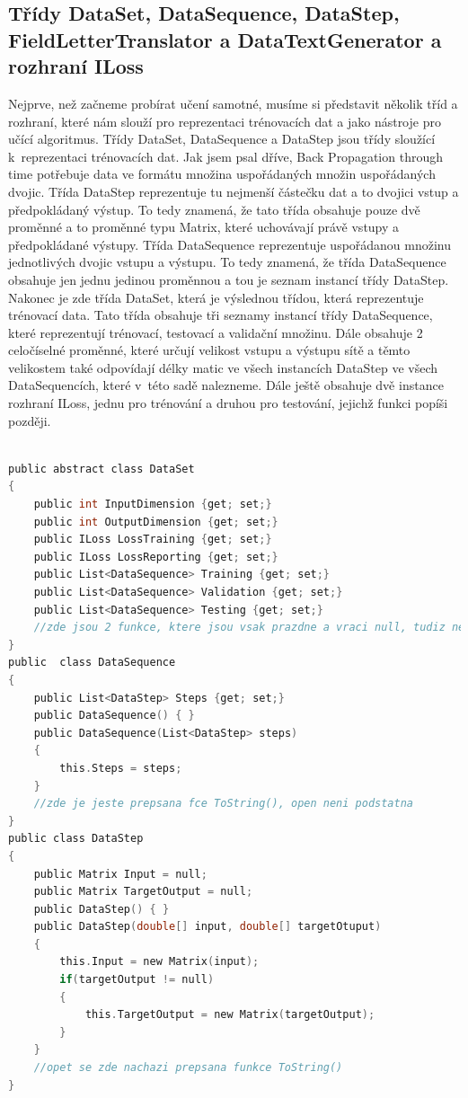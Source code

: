\documentclass[a4paper]{article}
\begin{document}
\subsection{Třídy DataSet, DataSequence, DataStep, FieldLetterTranslator a DataTextGenerator a rozhraní ILoss}
Nejprve, než začneme probírat učení samotné, musíme si představit několik tříd a rozhraní, které nám slouží pro reprezentaci trénovacích dat a jako nástroje pro učící algoritmus. Třídy DataSet, DataSequence a DataStep jsou třídy sloužící k~reprezentaci trénovacích dat. Jak jsem psal dříve, Back Propagation through time potřebuje data ve formátu množina uspořádaných množin uspořádaných dvojic. Třída DataStep reprezentuje tu nejmenší částečku dat a to dvojici vstup a předpokládaný výstup. To tedy znamená, že tato třída obsahuje pouze dvě proměnné a to proměnné typu Matrix, které uchovávají právě vstupy a předpokládané výstupy. Třída DataSequence reprezentuje uspořádanou množinu jednotlivých dvojic vstupu a výstupu. To tedy znamená, že třída DataSequence obsahuje jen jednu jedinou proměnnou a tou je seznam instancí třídy DataStep. Nakonec je zde třída DataSet, která je výslednou třídou, která reprezentuje trénovací data. Tato třída obsahuje tři seznamy instancí třídy DataSequence, které reprezentují trénovací, testovací a validační množinu. Dále obsahuje 2 celočíselné proměnné, které určují velikost vstupu a výstupu sítě a těmto velikostem také odpovídají délky matic ve všech instancích DataStep ve všech DataSequencích, které v~této sadě nalezneme. Dále ještě obsahuje dvě instance rozhraní ILoss, jednu pro trénování a druhou pro testování, jejichž funkci popíši později.
\begin{lstlisting}[language=c, title={Ukázka tříd DataStep, DataSequence a DataSet}]

public abstract class DataSet
{
	public int InputDimension {get; set;}
	public int OutputDimension {get; set;}
	public ILoss LossTraining {get; set;}
	public ILoss LossReporting {get; set;}
	public List<DataSequence> Training {get; set;}
	public List<DataSequence> Validation {get; set;}
	public List<DataSequence> Testing {get; set;}
	//zde jsou 2 funkce, ktere jsou vsak prazdne a vraci null, tudiz nejsou potreba uvadet
}
public  class DataSequence
{
	public List<DataStep> Steps {get; set;}
	public DataSequence() {	}
	public DataSequence(List<DataStep> steps)
	{
		this.Steps = steps;
	}
	//zde je jeste prepsana fce ToString(), open neni podstatna
}
public class DataStep
{
	public Matrix Input = null;
	public Matrix TargetOutput = null;
	public DataStep() { }
	public DataStep(double[] input, double[] targetOtuput)
	{
		this.Input = new Matrix(input);
		if(targetOutput != null)
		{
			this.TargetOutput = new Matrix(targetOutput);
		}
	}
	//opet se zde nachazi prepsana funkce ToString()
}
\end{lstlisting}
\end{document}
